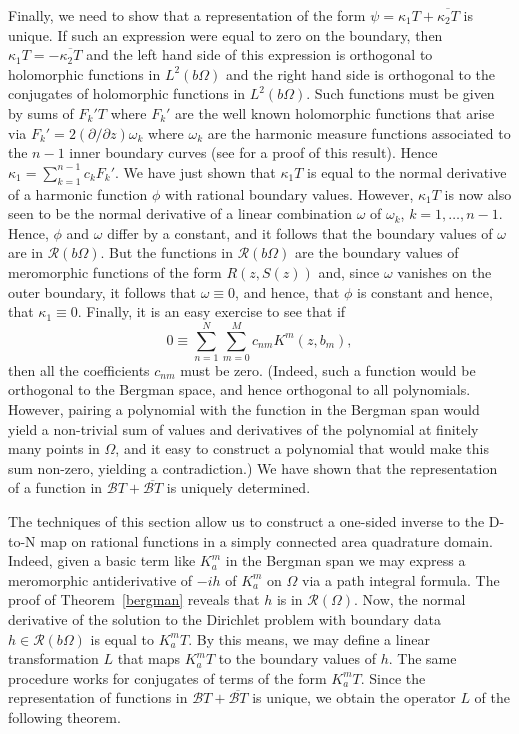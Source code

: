 \documentclass[12pt]{amsart}
\newcommand\dee{\partial}
\newcommand\Om{\Omega}
\numberwithin{equation}{section}
\begin{document}
Finally, we need to show that a representation of the
form $\psi=\kappa_1 T + \overline{\kappa_2 T}$ is unique.
If such an expression were equal to zero on
the boundary, then $\kappa_1 T=- \overline{\kappa_2 T}$
and the left hand side of this expression is orthogonal
to holomorphic functions in $L^2(b\Om)$ and the right hand
side is orthogonal to the conjugates of holomorphic
functions in $L^2(b\Om)$. Such functions must be given by
sums of $F_k'T$ where $F_k'$ are the well known holomorphic
functions that arise via $F_k'=2(\dee/\dee z)\omega_k$
where $\omega_k$ are the harmonic measure functions
associated to the $n-1$ inner boundary curves (see
\cite[p.~80]{B1} for a proof of this result). Hence
$\kappa_1=\sum_{k=1}^{n-1}c_kF_k'$. We have just shown
that $\kappa_1 T$ is equal to the normal derivative
of a harmonic function $\phi$ with rational boundary
values. However, $\kappa_1T$ is now also seen to be
the normal derivative of a linear combination $\omega$
of $\omega_k$, $k=1,\dots,n-1$. Hence, $\phi$ and
$\omega$ differ by a constant, and it follows that
the boundary values of $\omega$ are in $\mathcal{R}(b\Om)$.
But the functions in $\mathcal{R}(b\Om)$ are the
boundary values of meromorphic functions of the form
$R(z,S(z))$ and, since $\omega$ vanishes on the outer
boundary, it follows that $\omega\equiv0$, and hence,
that $\phi$ is constant and hence, that $\kappa_1\equiv0$.
Finally, it is an easy exercise to see that if
$$0\equiv \sum_{n=1}^N\sum_{m=0}^M c_{nm}K^m(z,b_m),$$
then all the coefficients $c_{nm}$ must be zero. (Indeed,
such a function would be orthogonal to the Bergman
space, and hence orthogonal to all polynomials. However,
pairing a polynomial with the function in the Bergman
span would yield a non-trivial sum of values and
derivatives of the polynomial at finitely many points
in $\Om$, and it easy to construct a polynomial that
would make this sum non-zero, yielding a contradiction.)
We have shown that the representation of a function
in $\mathcal B T+ \overline{\mathcal B T}$ is uniquely
determined.

The techniques of this section allow us to construct
a one-sided inverse to the D-to-N map on rational
functions in a simply connected area quadrature domain.
Indeed, given a basic term like $K_a^m$ in the Bergman span
we may express a meromorphic
antiderivative of $-ih$ of $K_a^m$ on $\Om$ via
a path integral formula. The proof
of Theorem~\ref{bergman} reveals that $h$ is in
${\mathcal R}(\Om)$. Now, the normal derivative of the
solution to the Dirichlet problem with boundary data
$h\in{\mathcal R}(b\Om)$ is equal to $K_a^mT$. By this
means, we may define a linear transformation $L$ that maps
$K_a^mT$ to the boundary values of $h$.  The same
procedure works for conjugates of terms of the form
$K_a^mT$. Since the representation of functions in
${\mathcal B}T+\overline{{\mathcal B}T}$ is unique,
we obtain the operator $L$ of the following theorem.
\end{document}
